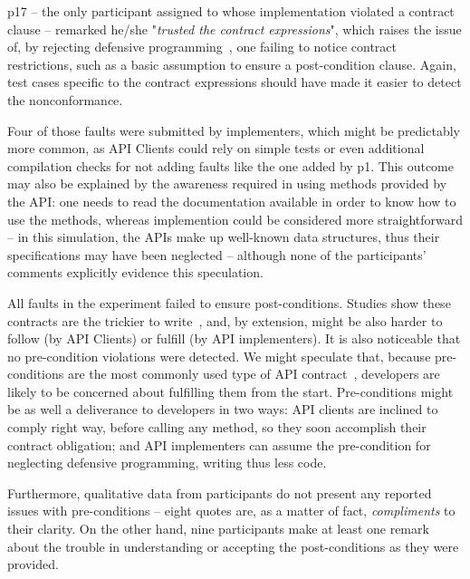 p17 -- the only participant assigned to \contractjdoc{} whose implementation violated a contract clause -- remarked he/she "\emph{trusted the contract expressions}", 
which raises the issue of, by rejecting defensive programming~\cite{}, one failing to notice contract restrictions, such as a basic assumption to ensure a post-condition clause.
Again, test cases specific to the contract expressions should have made it easier to detect the nonconformance.

Four of those faults were submitted by implementers, which might be predictably more common, as API Clients could rely on simple tests or even additional compilation checks for not adding faults like the one added by p1.
This outcome may also be explained by the awareness required in using methods provided by the API: one needs to read the documentation available in order to know how to use the methods, whereas implemention could be considered more straightforward -- in this simulation, 
the APIs make up well-known data structures, thus their specifications may have been neglected -- although none of the participants' comments explicitly evidence this speculation.

All faults in the experiment failed to ensure post-conditions. 
Studies show these contracts are the trickier to write~\cite{}, and, by extension, might be also harder to follow (by API Clients) or fulfill (by API implementers). 
It is also noticeable that no pre-condition violations were detected. We might speculate that, because pre-conditions are the most commonly used type of API contract~\cite{}, developers are likely to be concerned about fulfilling them from the start. 
Pre-conditions might be as well a deliverance to developers in two ways: API clients are inclined to comply right way, before calling any method, so they soon accomplish their contract obligation; and API implementers can assume the pre-condition for neglecting defensive programming, writing thus less code.

Furthermore, qualitative data from participants do not present any reported issues with pre-conditions -- eight quotes are, as a matter of fact, \emph{compliments} to their clarity. On the other hand, nine participants make at least one remark about the trouble in understanding or accepting the post-conditions as they were provided.


